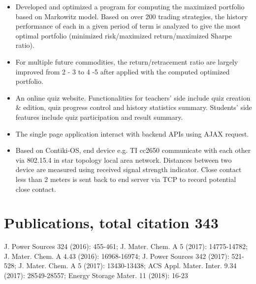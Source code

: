 \documentclass{resume}
\begin{document}
\begin{itemize}
  \item Developed and optimized a program for computing the maximized portfolio based on Markowitz model. Based on over 200 trading strategies, the history performance of each in a given period of term is analyzed to give the most optimal portfolio (minimized risk/maximized return/maximized Sharpe ratio).
  \item For multiple future commodities, the return/retracement ratio are largely improved from 2 - 3 to 4 -5 after applied with the computed optimized portfolio.
\end{itemize}


\begin{itemize}
  \item An online quiz website. Functionalities for teachers' side include quiz creation \& edition, quiz progress control and history statistics summary. Students' side features include quiz participation and result summary.
  \item The single page application interact with backend APIs using AJAX request. 
\end{itemize}

\begin{itemize}
  \item Based on Contiki-OS, end device e.g. TI cc2650 communicate with each other via 802.15.4 in star topology local area network. Distances between two device are measured using received signal strength indicator. Close contact less than 2 meters is sent back to end server via TCP to record potential close contact.
\end{itemize}

\section{Publications, total citation 343}
  J. Power Sources 324 (2016): 455-461; J. Mater. Chem. A 5 (2017): 14775-14782; J. Mater. Chem. A 4.43
  (2016): 16968-16974; J. Power Sources 342 (2017): 521-528; J. Mater. Chem. A 5 (2017): 13430-13438; ACS
  Appl. Mater. Inter. 9.34 (2017): 28549-28557; Energy Storage Mater. 11 (2018): 16-23
\end{document}
